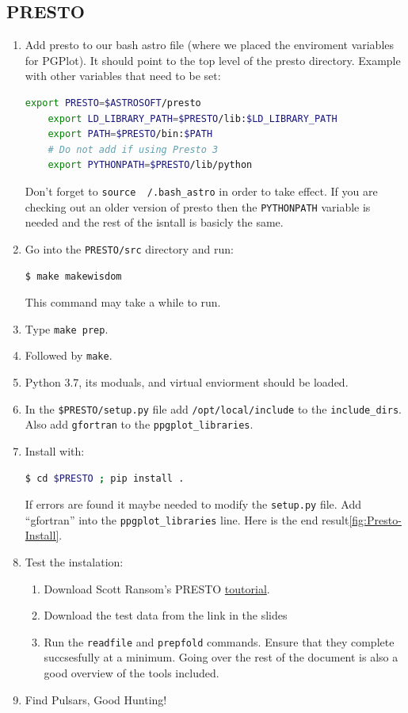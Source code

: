 \documentclass{article}
\begin{document}
\subsection{PRESTO}
\begin{enumerate}
    \item Add presto to our bash astro file (where we placed the enviroment variables for PGPlot). It should point to the top level of the presto directory. Example with other variables that need to be set: \begin{lstlisting}[language=bash]
    export PRESTO=$ASTROSOFT/presto
    export LD_LIBRARY_PATH=$PRESTO/lib:$LD_LIBRARY_PATH 
    export PATH=$PRESTO/bin:$PATH
    # Do not add if using Presto 3
    export PYTHONPATH=$PRESTO/lib/python 
    \end{lstlisting}
    Don't forget to \texttt{source ~/.bash\_astro} in order to take effect. If you are checking out an older version of presto then the \texttt{PYTHONPATH} variable is needed and the rest of the isntall is basicly the same.  
    \item Go into the \texttt{PRESTO/src} directory and run:  \begin{lstlisting}[language=bash]
    $ make makewisdom 
    \end{lstlisting}
    This command may take a while to run. 
    \item Type \texttt{make prep}.
    \item Followed by \texttt{make}.
    \item Python 3.7, its moduals, and virtual enviorment should be loaded.
    \item In the \texttt{\$PRESTO/setup.py} file add \texttt{/opt/local/include} to the \texttt{include\_dirs}. Also add \texttt{gfortran} to the \texttt{ppgplot\_libraries}.
    \item Install with: \begin{lstlisting}[language=bash]     
    $ cd $PRESTO ; pip install .
        \end{lstlisting}
        If errors are found it maybe needed to modify the \texttt{setup.py} file. Add ``gfortran'' into the \texttt{ppgplot\_libraries} line. 
        Here is the end result\ref{fig:Presto-Install}. 

    \item Test the instalation: 
        \begin{enumerate}
        \item Download Scott Ransom's PRESTO \href{https://www.cv.nrao.edu/~sransom/PRESTO_search_tutorial.pdf}{toutorial}.
        \item Download the test data from the link in the slides
        \item Run the \texttt{readfile} and \texttt{prepfold} commands. Ensure that they complete succsesfully at a minimum. Going over the rest of the document is also a good overview of the tools included.
        \end{enumerate}
    \item Find Pulsars, Good Hunting!
\end{enumerate}
\end{document}
